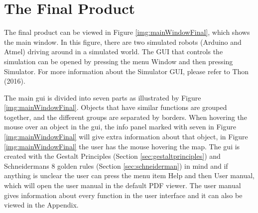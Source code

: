 \section{The Final Product}
The final product can be viewed in Figure \ref{img:mainWindowFinal}, which shows the main window. In this figure, there are two simulated robots (Arduino and Atmel) driving around in a simulated world. The GUI that controls the simulation can be opened by pressing the menu Window and then pressing Simulator. For more information about the Simulator GUI, please refer to Thon (2016).


The main \acrshort{gui} is divided into seven parts as illustrated by Figure \ref{img:mainWindowFinal}. Objects that have similar functions are grouped together, and the different groups are separated by borders. When hovering the mouse over an object in the \acrshort{gui}, the info panel marked with seven in Figure \ref{img:mainWindowFinal} will give extra information about that object, in Figure \ref{img:mainWindowFinal} the user has the mouse hovering the map. The \acrshort{gui} is created with the Gestalt Principles (Section \ref{sec:gestaltprinciples}) and Schneidermans 8 golden rules (Section \ref{sec:schneiderman}) in mind and if anything is unclear the user can press the menu item Help and then User manual, which will open the user manual in the default PDF viewer. The user manual gives information about every function in the user interface and it can also be viewed in the Appendix.